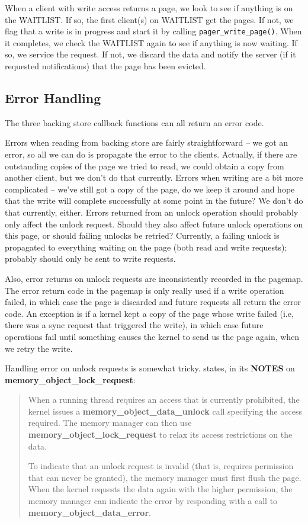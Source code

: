 \documentclass{article}
\def\pagerwritepage{{\tt pager_write_page()}\xspace}
\begin{document}
When a client with write access returns a page, we look to see if
anything is on the WAITLIST.  If so, the first client(s) on WAITLIST
get the pages.  If not, we flag that a write is in progress and start
it by calling \pagerwritepage.  When it completes, we check the
WAITLIST again to see if anything is now waiting.  If so, we service
the request.  If not, we discard the data and notify the server (if
it requested notifications) that the page has been evicted.



\subsection{Error Handling}

The three backing store callback functions can all return an error
code.

Errors when reading from backing store are fairly straightforward --
we got an error, so all we can do is propagate the error to the
clients.  Actually, if there are outstanding copies of the page we
tried to read, we could obtain a copy from another client, but we
don't do that currently.  Errors when writing are a bit more
complicated -- we've still got a copy of the page, do we keep it
around and hope that the write will complete successfully at some
point in the future?  We don't do that currently, either.  Errors
returned from an unlock operation should probably only affect the
unlock request.  Should they also affect future unlock operations on
this page, or should failing unlocks be retried?  Currently, a failing
unlock is propagated to everything waiting on the page (both read and
write requests); probably should only be sent to write requests.

Also, error returns on unlock requests are inconsistently recorded in
the pagemap.  The error return code in the pagemap is only really used
if a write operation failed, in which case the page is discarded and
future requests all return the error code.  An exception is if a
kernel kept a copy of the page whose write failed (i.e, there was a
sync request that triggered the write), in which case future
operations fail until something causes the kernel to send us the page
again, when we retry the write.

Handling error on unlock requests is somewhat tricky.
\cite{interfaces} states, in its {\bf NOTES} on {\bf
  memory_object_lock_request}:

\begin{quote}
When a running thread requires an access that is currently prohibited,
the kernel issues a {\bf memory_object_data_unlock} call specifying
the access required. The memory manager can then use {\bf
  memory_object_lock_request} to relax its access restrictions on the
data.

To indicate that an unlock request is invalid (that is, requires
permission that can never be granted), the memory manager must first
flush the page. When the kernel requests the data again with the
higher permission, the memory manager can indicate the error by
responding with a call to {\bf memory_object_data_error}.
\end{quote}
\end{document}
